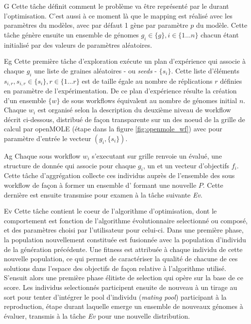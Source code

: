 \begin{myitemize}

\item[G] Cette tâche définit comment le problème va être représenté par le  durant l'optimisation. C'est aussi à ce moment là que le mapping est réalisé avec les paramètres du modèles, avec par défaut 1 gène par paramètre $p$ du modèle. Cette tâche génère ensuite un ensemble de génomes $g_i \in \{g\}, i \in \{1 \dotsc n\}$ chacun étant initialisé par des valeurs de paramètres aléatoires.

\item[Eg] Cette première tâche d'exploration exécute un plan d'expérience qui associe à chaque  $g_i$ une liste de graines aléatoires  - ou \textit{seeds} - $\{s_i\}$. Cette liste d'éléments $s_{i,r} , s_{i,r} \in \{s_i\}, r \in \{1 \dotsc r\}$ est de taille égale au nombre de réplications $r$ définies en paramètre de l'expérimentation. De ce plan d'expérience résulte la création d'un ensemble $\{w\}$ de sous workflows équivalent au nombre de génomes initial $n$. Chaque $w_i$ est organisé selon la description du deuxième niveau de workflow décrit ci-dessous, distribué de façon transparente sur un des noeud de la grille de calcul par openMOLE (étape  dans la figure \ref{fig:openmole_wf}) avec pour paramètre d'entrée le vecteur $(g_i, \{s_i\})$.

\item[Ag] Chaque sous workflow $w_i$ s'executant sur grille renvoie un  évalué, une structure de donnée qui associe pour chaque  $g_i$, un  et un vecteur d'objectifs $f_i$. Cette tâche d'aggrégation collecte ces individus auprès de l'ensemble des sous workflow de façon à former un ensemble d' formant une nouvelle  $P$. Cette dernière est ensuite transmise pour examen à la tâche suivante \textit{Ev}.

\item[Ev] Cette tâche contient le coeur de l'algorithme d'optimisation, dont le comportement est fonction de l'algorithme évolutionnaire selectionné ou composé, et des paramètres choisi par l'utilisateur pour celui-ci. Dans une première phase, la population nouvellement constituée est fusionnée avec la population d'individu de la génération précédente. Une fitness est attribuée à chaque individu de cette nouvelle population, ce qui permet de caractériser la qualité de chacune de ces solutions dans l'espace des objectifs de façon relative à l'algorithme utilisé. S'ensuit alors une première phase élitiste de selection qui opère sur la base de ce score. Les individus selectionnés participent ensuite de nouveau à un tirage au sort pour tenter d'intégrer le pool d'individu (\textit{mating pool}) participant à la reproduction, étape durant laquelle emerge un ensemble de nouveaux génomes à évaluer, transmis à la tâche \textit{Ev} pour une nouvelle distribution.
\end{myitemize}

